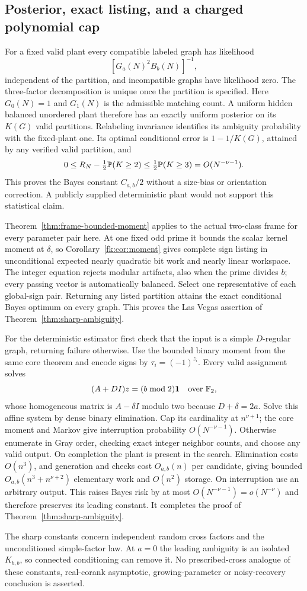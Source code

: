 \subsection{Posterior, exact listing, and a charged polynomial cap}\label{sec:enumeration}
For a fixed valid plant every compatible labeled graph has likelihood
\[
 [G_a(N)^2B_b(N)]^{-1},
\]
independent of the partition, and incompatible graphs have likelihood
zero. The three-factor decomposition is unique once the partition is
specified. Here $G_0(N)=1$ and $G_1(N)$ is the admissible matching
count. A uniform hidden balanced unordered plant therefore has an
exactly uniform posterior on its $K(G)$ valid partitions. Relabeling
invariance identifies its ambiguity probability with the fixed-plant
one. Its optimal conditional error is $1-1/K(G)$, attained by any
verified valid partition, and
\[
 0\le R_N-\tfrac12\mathbb P(K\ge2)
                  \le\tfrac12\mathbb P(K\ge3)=O(N^{-\nu-1}).
\]
This proves the Bayes constant $C_{a,b}/2$ without a size-bias or
orientation correction. A publicly supplied deterministic plant
would not support this statistical claim.

Theorem~\ref{thm:frame-bounded-moment} applies to the actual two-class
frame for every parameter pair here. At one fixed odd prime it bounds
the scalar kernel moment at $\delta$, so
Corollary~\ref{fk:cor:moment} gives complete sign listing in
unconditional expected nearly quadratic bit work and nearly linear
workspace. The integer equation rejects modular artifacts, also when
the prime divides $b$; every passing vector is automatically balanced.
Select one representative of each global-sign pair. Returning any
listed partition attains the exact conditional Bayes optimum on every
graph. This proves the Las Vegas assertion of
Theorem~\ref{thm:sharp-ambiguity}.

For the deterministic estimator first check that the input is a
simple $D$-regular graph, returning failure otherwise. Use the bounded
binary moment from the same core theorem and encode signs by
$\tau_i=(-1)^{z_i}$.
Every valid assignment solves
\[
 (A+DI)z=(b\bmod2)\mathbf 1\quad\text{over }\mathbb F_2,
\]
whose homogeneous matrix is $A-\delta I$ modulo two because
$D+\delta=2a$. Solve this affine system by dense binary elimination.
Cap its cardinality at $n^{\nu+1}$; the core moment and Markov give
interruption probability $O(N^{-\nu-1})$. Otherwise enumerate in
Gray order, checking exact integer neighbor counts, and choose any
valid output. On completion the plant is present in the search.
Elimination costs $O(n^3)$, and generation and checks cost $O_{a,b}(n)$
per candidate, giving bounded $O_{a,b}(n^3+n^{\nu+2})$ elementary
work and $O(n^2)$ storage. On interruption use an arbitrary output.
This raises Bayes risk by at most $O(N^{-\nu-1})=o(N^{-\nu})$ and
therefore preserves its leading constant. It completes the proof of
Theorem~\ref{thm:sharp-ambiguity}.

The sharp constants concern independent random cross factors and the
unconditioned simple-factor law. At $a=0$ the leading ambiguity is an
isolated $K_{b,b}$, so connected conditioning can remove it. No
prescribed-cross analogue of these constants, real-corank asymptotic,
growing-parameter or noisy-recovery conclusion is asserted.
